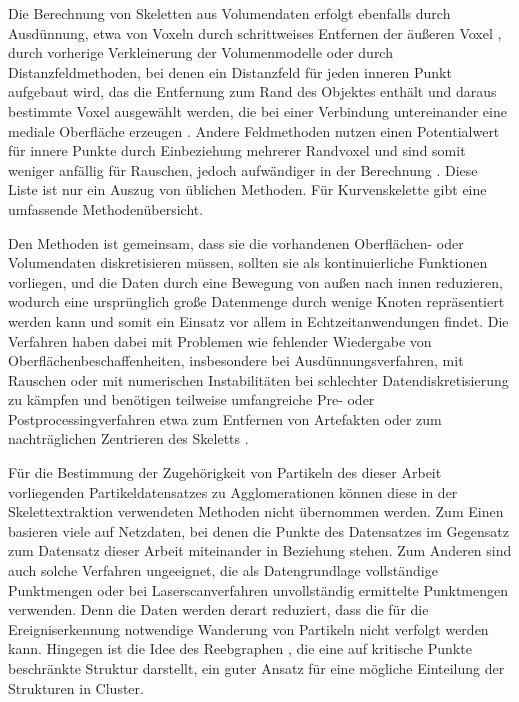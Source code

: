 Die Berechnung von Skeletten aus Volumendaten erfolgt ebenfalls durch Ausdünnung, etwa von Voxeln durch schrittweises Entfernen der äußeren Voxel \cite{ma2002TopologyPreservingReduction}, durch vorherige Verkleinerung der Volumenmodelle \cite{wang2008curveSkeletonExtraction} oder durch Distanzfeldmethoden, bei denen ein Distanzfeld für jeden inneren Punkt aufgebaut wird, das die Entfernung zum Rand des Objektes enthält und daraus bestimmte Voxel ausgewählt werden, die bei einer Verbindung untereinander eine mediale Oberfläche erzeugen \cite{hassouna2005robustCenterlineExtraction}. Andere Feldmethoden nutzen einen Potentialwert für innere Punkte durch Einbeziehung mehrerer Randvoxel und sind somit weniger anfällig für Rauschen, jedoch aufwändiger in der Berechnung \cite{cornea2005hierarchicalCurveSkeletons}. Diese Liste ist nur ein Auszug von üblichen Methoden. Für Kurvenskelette gibt \cite{cornea2007curveSkeletonProperties} eine umfassende Methodenübersicht.

Den Methoden ist gemeinsam, dass sie die vorhandenen Oberflächen- oder Volumendaten diskretisieren müssen, sollten sie als kontinuierliche Funktionen vorliegen, und die Daten durch eine Bewegung von außen nach innen reduzieren, wodurch eine ursprünglich große Datenmenge durch wenige Knoten repräsentiert werden kann und somit ein Einsatz vor allem in Echtzeitanwendungen findet. Die Verfahren haben dabei mit Problemen wie fehlender Wiedergabe von Oberflächenbeschaffenheiten, insbesondere bei Ausdünnungsverfahren, mit Rauschen oder mit numerischen Instabilitäten bei schlechter Datendiskretisierung zu kämpfen und benötigen teilweise umfangreiche Pre- oder Postprocessingverfahren etwa zum Entfernen von Artefakten oder zum nachträglichen Zentrieren des Skeletts \cite{cornea2007curveSkeletonProperties}.


Für die Bestimmung der Zugehörigkeit von Partikeln des dieser Arbeit vorliegenden Partikeldatensatzes zu Agglomerationen können diese in der Skelettextraktion verwendeten Methoden nicht übernommen werden. Zum Einen basieren viele auf Netzdaten, bei denen die Punkte des Datensatzes im Gegensatz zum Datensatz dieser Arbeit miteinander in Beziehung stehen. Zum Anderen sind auch solche Verfahren ungeeignet, die als Datengrundlage vollständige Punktmengen \cite{wang2008curveSkeletonExtraction} \cite{sharf2007onTheFlyCurveSkeleton} oder bei Laserscanverfahren unvollständig ermittelte Punktmengen \cite{tagliasacchi2009curveIncompletePointCloud} verwenden. Denn die Daten werden derart reduziert, dass die für die Ereigniserkennung notwendige Wanderung von Partikeln nicht verfolgt werden kann. Hingegen ist die Idee des Reebgraphen \cite{pascucci2007computationReebGraph}, die eine auf kritische Punkte beschränkte Struktur darstellt, ein guter Ansatz für eine mögliche Einteilung der Strukturen in Cluster.


